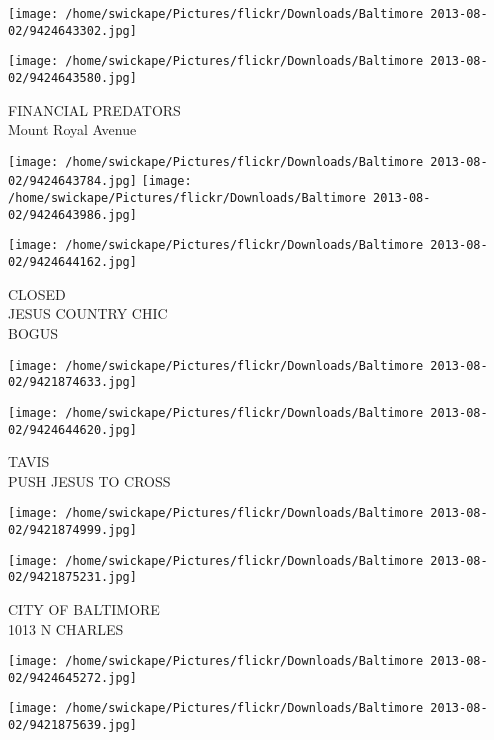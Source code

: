 \documentclass[10pt,letterpaper]{article}
\begin{document}
\texttt{[image: /home/swickape/Pictures/flickr/Downloads/Baltimore 2013-08-02/9424643302.jpg]}

\vspace{0.25in}
\texttt{[image: /home/swickape/Pictures/flickr/Downloads/Baltimore 2013-08-02/9424643580.jpg]}

FINANCIAL PREDATORS\\
Mount Royal Avenue\\
\pagebreak

\texttt{[image: /home/swickape/Pictures/flickr/Downloads/Baltimore 2013-08-02/9424643784.jpg]}
\texttt{[image: /home/swickape/Pictures/flickr/Downloads/Baltimore 2013-08-02/9424643986.jpg]}

\vspace{0.25in}
\texttt{[image: /home/swickape/Pictures/flickr/Downloads/Baltimore 2013-08-02/9424644162.jpg]}

CLOSED\\
JESUS COUNTRY CHIC\\
BOGUS\\
\pagebreak

\texttt{[image: /home/swickape/Pictures/flickr/Downloads/Baltimore 2013-08-02/9421874633.jpg]}

\vspace{0.25in}
\texttt{[image: /home/swickape/Pictures/flickr/Downloads/Baltimore 2013-08-02/9424644620.jpg]}

TAVIS\\
PUSH JESUS TO CROSS\\
\pagebreak

\texttt{[image: /home/swickape/Pictures/flickr/Downloads/Baltimore 2013-08-02/9421874999.jpg]}

\vspace{0.25in}
\texttt{[image: /home/swickape/Pictures/flickr/Downloads/Baltimore 2013-08-02/9421875231.jpg]}

CITY OF BALTIMORE\\
1013 N CHARLES\\
\pagebreak

\texttt{[image: /home/swickape/Pictures/flickr/Downloads/Baltimore 2013-08-02/9424645272.jpg]}

\vspace{0.25in}
\texttt{[image: /home/swickape/Pictures/flickr/Downloads/Baltimore 2013-08-02/9421875639.jpg]}
\end{document}
